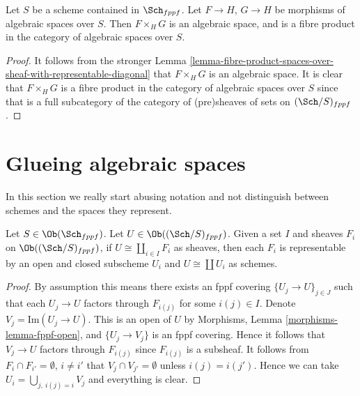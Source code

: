 \begin{lemma}
\label{lemma-fibre-product-spaces}
Let $S$ be a scheme contained in $\Sch_{fppf}$.
Let $F \to H$, $G \to H$ be morphisms of algebraic spaces over $S$.
Then $F \times_H G$ is an algebraic space, and is a fibre product
in the category of algebraic spaces over $S$.
\end{lemma}

\begin{proof}
It follows from the stronger
Lemma \ref{lemma-fibre-product-spaces-over-sheaf-with-representable-diagonal}
that $F \times_H G$ is an algebraic space.
It is clear that $F \times_H G$
is a fibre product in the category of algebraic spaces over $S$
since that is a full subcategory of the category
of (pre)sheaves of sets on $(\Sch/S)_{fppf}$.
\end{proof}






\section{Glueing algebraic spaces}
\label{section-glueing-algebraic-spaces}

\noindent
In this section we really start abusing notation and not
distinguish between schemes and the spaces they represent.

\begin{lemma}
\label{lemma-representable-sheaf-coproduct-sheaves}
Let $S \in \Ob(\Sch_{fppf})$.
Let $U \in \Ob((\Sch/S)_{fppf})$.
Given a set $I$ and sheaves $F_i$ on $\Ob((\Sch/S)_{fppf})$,
if $U \cong \coprod_{i\in I} F_i$
as sheaves, then each $F_i$ is representable by an open and closed
subscheme $U_i$ and $U \cong \coprod U_i$ as schemes.
\end{lemma}

\begin{proof}
By assumption this means there exists an fppf covering
$\{U_j \to U\}_{j \in J}$ such that each $U_j \to U$
factors through $F_{i(j)}$ for some $i(j) \in I$.
Denote $V_j = \text{Im}(U_j \to U)$.
This is an open of $U$ by
Morphisms, Lemma \ref{morphisms-lemma-fppf-open}, and
$\{U_j \to V_j\}$ is an fppf covering. Hence it follows that
$V_j \to U$ factors through $F_{i(j)}$ since $F_{i(j)}$ is
a subsheaf. It follows from $F_i \cap F_{i'} = \emptyset$, $i \not = i'$
that $V_j \cap V_{j'} = \emptyset$
unless $i(j) = i(j')$. Hence we can take
$U_i = \bigcup_{j, \ i(j) = i} V_j$ and everything is clear.
\end{proof}


